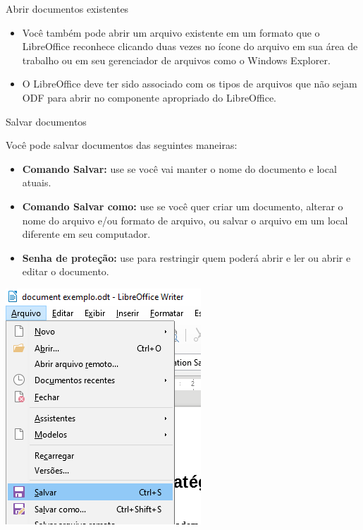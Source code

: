 \begin{frame}{Abrir documentos existentes}
	\begin{block}{}
		\begin{itemize}
			\item Você também pode abrir um arquivo existente em um formato que o LibreOffice reconhece clicando duas vezes no ícone do arquivo em sua área de trabalho ou em seu gerenciador de arquivos como o Windows Explorer.
			\item O LibreOffice deve ter sido associado com os tipos de arquivos que não sejam ODF para abrir no componente apropriado do LibreOffice.
		\end{itemize}
	\end{block}

\end{frame}


\begin{frame}{Salvar documentos}
	\begin{block}{}
		Você pode salvar documentos das seguintes maneiras:
		\begin{itemize}
			\item \textbf{Comando Salvar:} use se você vai manter o nome do documento e local atuais.
			\item \textbf{Comando Salvar como:} use se você quer criar um documento, alterar o nome do arquivo e/ou formato de arquivo, ou salvar o arquivo em um local diferente em seu computador.
			\item \textbf{Senha de proteção:} use para restringir quem poderá abrir e ler ou abrir e editar o documento.
		\end{itemize}
	\end{block}

	\centering
	\includegraphics[width=0.23\linewidth]{Figuras/Ch04/fig34}
\end{frame}


